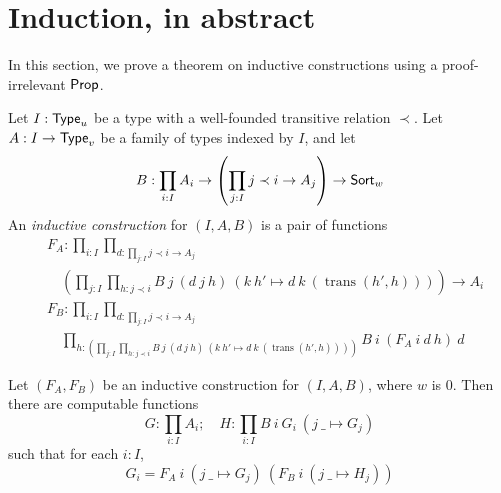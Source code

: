 \section{Induction, in abstract}
In this section, we prove a theorem on inductive constructions using a proof-irrelevant \( \mathsf{Prop} \).
\begin{definition}
  \label{def:IC}
  Let \( I : \mathsf{Type}_u \) be a type with a well-founded transitive relation \( \prec \).
  Let \( A : I \to \mathsf{Type}_v \) be a family of types indexed by \( I \), and let
  \[ B : \prod_{i : I} A_i \to \left(\prod_{j : I} j \prec i \to A_j\right) \to \mathsf{Sort}_w \]
  An \emph{inductive construction} for \( (I, A, B) \) is a pair of functions
  \begin{align*}
    &F_A : \prod_{i : I} \prod_{d : \prod_{j : I} j \prec i \to A_j} \\
    &\quad\left( \prod_{j : I} \prod_{h : j \prec i} B\ j\ (d\ j\ h)\ (k\ h' \mapsto d\ k\ (\operatorname{trans}(h',h))) \right) \to A_i \\
    &F_B : \prod_{i : I} \prod_{d : \prod_{j : I} j \prec i \to A_j} \\
    &\quad\prod_{h : \left( \prod_{j : I} \prod_{h : j \prec i} B\ j\ (d\ j\ h)\ (k\ h' \mapsto d\ k\ (\operatorname{trans}(h',h))) \right)} B\ i\ (F_A\ i\ d\ h)\ d
  \end{align*}
\end{definition}
\begin{proposition}
  \label{prop:IC.fix_prop}
  Let \( (F_A, F_B) \) be an inductive construction for \( (I, A, B) \), where \( w \) is \( 0 \).
  Then there are computable functions
  \[ G : \prod_{i : I} A_i;\quad H : \prod_{i : I} B\ i\ G_i\ (j\ \_ \mapsto G_j) \]
  such that for each \( i : I \),
  \[ G_i = F_A\ i\ (j\ \_ \mapsto G_j)\ (F_B\ i\ (j\ \_ \mapsto H_j)) \]
\end{proposition}
